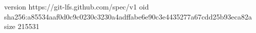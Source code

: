 version https://git-lfs.github.com/spec/v1
oid sha256:a85534aaf0d0c9c0230c3230a4adffabe6e90c3e4435277a67cdd25b93eca82a
size 215531
